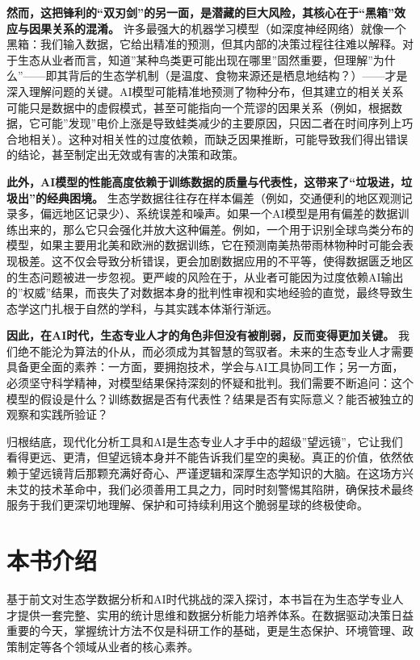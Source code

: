 \documentclass[
  twoside]{book}
\begin{document}
\textbf{然而，这把锋利的``双刃剑''的另一面，是潜藏的巨大风险，其核心在于``黑箱''效应与因果关系的混淆。} 许多最强大的机器学习模型（如深度神经网络）就像一个黑箱：我们输入数据，它给出精准的预测，但其内部的决策过程往往难以解释。对于生态从业者而言，知道''某种鸟类更可能出现在哪里''固然重要，但理解''为什么''------即其背后的生态学机制（是温度、食物来源还是栖息地结构？）------才是深入理解问题的关键。AI模型可能精准地预测了物种分布，但其建立的相关关系可能只是数据中的虚假模式，甚至可能指向一个荒谬的因果关系（例如，根据数据，它可能''发现''电价上涨是导致蛙类减少的主要原因，只因二者在时间序列上巧合地相关）。这种对相关性的过度依赖，而缺乏因果推断，可能导致我们得出错误的结论，甚至制定出无效或有害的决策和政策。

\textbf{此外，AI模型的性能高度依赖于训练数据的质量与代表性，这带来了``垃圾进，垃圾出''的经典困境。} 生态学数据往往存在样本偏差（例如，交通便利的地区观测记录多，偏远地区记录少）、系统误差和噪声。如果一个AI模型是用有偏差的数据训练出来的，那么它只会强化并放大这种偏差。例如，一个用于识别全球鸟类分布的模型，如果主要用北美和欧洲的数据训练，它在预测南美热带雨林物种时可能会表现极差。这不仅会导致分析错误，更会加剧数据应用的不平等，使得数据匮乏地区的生态问题被进一步忽视。更严峻的风险在于，从业者可能因为过度依赖AI输出的''权威''结果，而丧失了对数据本身的批判性审视和实地经验的直觉，最终导致生态学这门扎根于自然的学科，与其实践本体渐行渐远。

\textbf{因此，在AI时代，生态专业人才的角色非但没有被削弱，反而变得更加关键。} 我们绝不能沦为算法的仆从，而必须成为其智慧的驾驭者。未来的生态专业人才需要具备更全面的素养：一方面，要拥抱技术，学会与AI工具协同工作；另一方面，必须坚守科学精神，对模型结果保持深刻的怀疑和批判。我们需要不断追问：这个模型的假设是什么？训练数据是否有代表性？结果是否有实际意义？能否被独立的观察和实践所验证？

归根结底，现代化分析工具和AI是生态专业人才手中的超级''望远镜''，它让我们看得更远、更清，但望远镜本身并不能告诉我们星空的奥秘。真正的价值，依然依赖于望远镜背后那颗充满好奇心、严谨逻辑和深厚生态学知识的大脑。在这场方兴未艾的技术革命中，我们必须善用工具之力，同时时刻警惕其陷阱，确保技术最终服务于我们更深切地理解、保护和可持续利用这个脆弱星球的终极使命。

\hypertarget{ux672cux4e66ux4ecbux7ecd}{%
\section{本书介绍}\label{ux672cux4e66ux4ecbux7ecd}}

基于前文对生态学数据分析和AI时代挑战的深入探讨，本书旨在为生态学专业人才提供一套完整、实用的统计思维和数据分析能力培养体系。在数据驱动决策日益重要的今天，掌握统计方法不仅是科研工作的基础，更是生态保护、环境管理、政策制定等各个领域从业者的核心素养。
\end{document}

